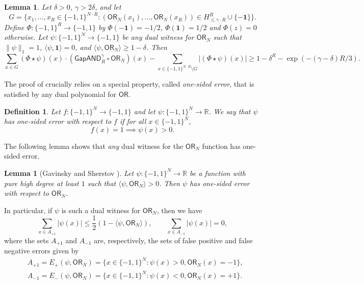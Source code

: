 \documentclass[11pt, letterpaper, fleqn]{article}
\newtheorem{definition}[theorem]{Definition}
\newtheorem{lemma}[theorem]{Lemma}
\theoremstyle{plain}
\newcommand{\R}{\mathbb{R}}
\newcommand{\OR}{\mathsf{ OR}}
\newcommand{\bits}{\{-1,1\}}
\newcommand{\ls}{\star}
\newcommand{\GAPAND}{\mathsf{GapAND}}
\begin{document}
\begin{lemma} \label{lem:ughcor}
Let $\delta > 0$, $\gamma > 2\delta$, and let $$G=\{x_1, \dots, x_R \in \bits^{N \cdot R} \colon (\OR_N(x_1), \dots, \OR_N(x_R)) \in
H_{\leq \gamma \cdot R}^R \cup \{\mathbf{-1}\}\}.$$
Define $\Phi : \bits^R \to \bits$ by $\Phi(-\mathbf{1}) = -1/2$, $\Phi(\mathbf{1}) = 1/2$ and $\Phi(z) = 0$ otherwise. Let $\psi : \bits^N \to \bits$ be any dual witness for $\OR_N$ such that $\|\psi\|_1 = 1$, $\langle \psi, \mathbf{1}\rangle = 0$, and $\langle \psi, \OR_N \rangle \ge 1 - \delta$. Then
\[\sum_{x \in G}  ( \Phi \ls \psi)(x) \cdot \left(\GAPAND_{R}^{\gamma} \circ \OR_N\right)(x) - \sum_{x \in\bits^{N \cdot R} \setminus G} |(\Phi \ls \psi)(x)|
\geq 1-\delta^R -\exp(-(\gamma - \delta) R/3).\]
\end{lemma}

The proof of  crucially relies on a special property, called \emph{one-sided error}, that is satisfied by any dual polynomial for $\OR$.

\begin{definition}
Let $f : \bits^N \to \bits$ and let $\psi : \bits^N \to \R$. We say that $\psi$ has one-sided error with respect to $f$ if for all $x \in \bits^N$,
\begin{equation}
f(x) = 1 \implies \psi(x) > 0.
\end{equation}
\end{definition}
The following lemma shows that \emph{any} dual witness for the $\OR_N$ function has one-sided error.

\begin{lemma}[Gavinsky and Sherstov \cite{comm2}] \label{lem:gs}
Let $\psi : \bits^N \to \R$ be a function with pure high degree at least $1$ such that $\langle \psi, \OR_N \rangle > 0$. Then $\psi$ has one-sided error with respect to $\OR_N$.
\end{lemma}


In particular, if $\psi$ is such a dual witness for $\OR_N$, then we have
\begin{equation} \label{eqn:mybullshitequation}
\sum_{x \in A_{+1}} |\psi(x)| \le \frac{1}{2}(1 - \langle \psi, \OR_N \rangle), \qquad \sum_{x \in A_{-1}} |\psi(x)| = 0,
\end{equation}
where the sets $A_{+1}$ and $A_{-1}$ are, respectively, the sets of false positive and false negative errors given by
\begin{align*}
&A_{+1} = E_+(\psi, \OR_N) = \{x \in \bits^N : \psi(x) > 0,  \OR_N(x) = -1\}, \\
&A_{-1} = E_-(\psi, \OR_N) = \{x \in \bits^N : \psi(x) < 0, \OR_N(x) = +1\}.
\end{align*}
\end{document}
